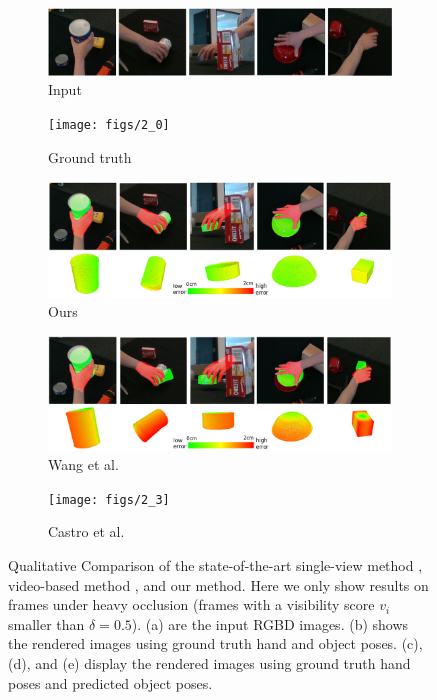 \begin{figure}[!ht]
    \begin{subfigure}{0.98\textwidth}
        \includegraphics[width=\linewidth]{figs/2_rgb}
        \caption{Input}
    \end{subfigure}
    \hfill
    \begin{subfigure}{0.98\textwidth}
        \texttt{[image: figs/2\_0]}
        \caption{Ground truth}
    \end{subfigure}
    \hfill
    \begin{subfigure}{0.98\textwidth}
        \includegraphics[width=\linewidth]{figs/2_1}
        \caption{Ours}
    \end{subfigure}
    \hfill
    \begin{subfigure}{0.98\textwidth}
        \includegraphics[width=\linewidth]{figs/2_2}
        \caption{Wang et al. \cite{wang2023deep}}
    \end{subfigure}
    \hfill
    \begin{subfigure}{0.98\textwidth}
        \texttt{[image: figs/2\_3]}
        \caption{Castro et al. \cite{castro2023crt}}
    \end{subfigure}
    \caption{Qualitative Comparison of the state-of-the-art single-view method \cite{castro2023crt}, video-based method \cite{wang2023deep},
and our method. Here we only show results on frames under heavy occlusion (frames with a visibility score \( v_i \) smaller than \( \delta = 0.5 \)). (a) are the input RGBD images. (b) shows the rendered images using ground truth hand and object poses. (c), (d), and (e) display the rendered images using ground truth hand poses and predicted object poses.}
    \label{fig:result2}
\end{figure}

